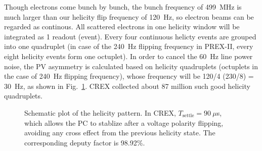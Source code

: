 Though electrons come bunch by bunch, the bunch frequency of 499~MHz is much
larger than our helicity flip frequency of 120~Hz, so electron beams can be regarded
as continous. All scattered electrons in one helicity window will be integrated as 1
readout (event). Every four continuous helicty events are grouped into one quadruplet
(in case of the 240~Hz flipping frequency in PREX-II, every eight helicity events 
form one octuplet).
In order to cancel the 60~Hz line power noise, the PV asymmetry is
calculated based on helicity quadruplets (octuplets in the case of 240~Hz flipping frequency), 
whose frequency will be 120/4 (230/8) = 30~Hz, as shown in Fig.~\ref{fig:helicity_pattern}. 
CREX collected about 87 million such good helicity quadruplets.
\begin{figure}[!h]
    \centering
    \caption[Helicity pattern]
    {Schematic plot of the helicity pattern. In CREX, $T_{\text{settle}} = 90\ \mu$s, 
    which allows the PC to stablize after a voltage polarity flipping, avoiding 
    any cross effect from the previous helicity state. The corresponding deputy factor 
    is 98.92\%.}
    \label{fig:helicity_pattern}
\end{figure}

